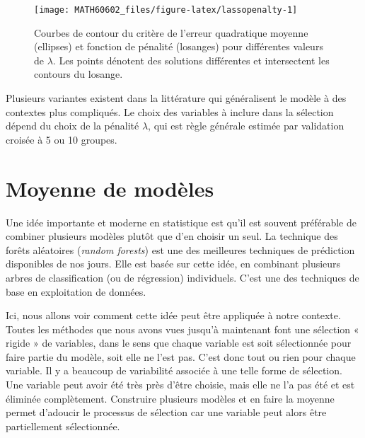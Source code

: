 \documentclass[
  11pt,
  letterpaper,
]{book}
\theoremstyle{definition}
\theoremstyle{definition}
\theoremstyle{definition}
\theoremstyle{remark}
\begin{document}
\begin{figure}

{\centering \texttt{[image: MATH60602\_files/figure-latex/lassopenalty-1]} 

}

\caption{Courbes de contour du critère de l'erreur quadratique moyenne (ellipses) et fonction de pénalité (losanges) pour différentes valeurs de $\lambda$. Les points dénotent des solutions différentes et intersectent les contours du losange.}\label{fig:lassopenalty}
\end{figure}

Plusieurs variantes existent dans la littérature qui généralisent le modèle à des contextes plus compliqués. Le choix des variables à inclure dans la sélection dépend du choix de la pénalité \(\lambda\), qui est règle générale estimée par validation croisée à 5 ou 10 groupes.

\hypertarget{moyenne-de-moduxe8les}{%
\section{Moyenne de modèles}\label{moyenne-de-moduxe8les}}

Une idée importante et moderne en statistique est qu'il est souvent préférable de combiner plusieurs modèles plutôt que d'en choisir un seul. La technique des forêts aléatoires (\emph{random forests}) est une des meilleures techniques de prédiction disponibles de nos jours. Elle est basée sur cette idée, en combinant plusieurs arbres de classification (ou de régression) individuels. C'est une des techniques de base en exploitation de données.

Ici, nous allons voir comment cette idée peut être appliquée à notre contexte. Toutes les méthodes que nous avons vues jusqu'à maintenant font une sélection « rigide » de variables, dans le sens que chaque variable est soit sélectionnée pour faire partie du modèle, soit elle ne l'est pas. C'est donc tout ou rien pour chaque variable. Il y a beaucoup de variabilité associée à une telle forme de sélection. Une variable peut avoir été très près d'être choisie, mais elle ne l'a pas été et est éliminée complètement. Construire plusieurs modèles et en faire la moyenne permet d'adoucir le processus de sélection car une variable peut alors être partiellement sélectionnée.
\end{document}
